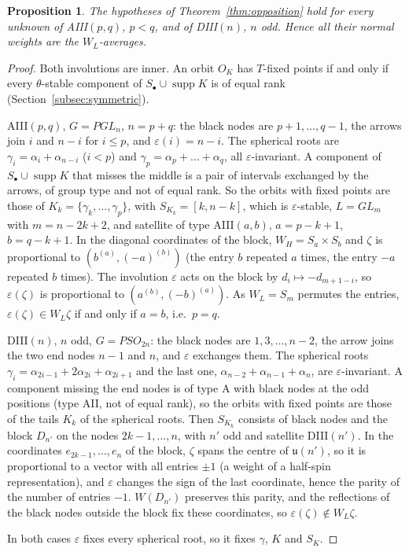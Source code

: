 \documentclass[11pt]{amsart}
\newtheorem{proposition}[theorem]{Proposition}
\theoremstyle{definition}
\theoremstyle{remark}
\DeclareMathOperator{\supp}{supp}
\begin{document}
\begin{proposition}\label{prop:oppositionAD}
The hypotheses of Theorem~\ref{thm:opposition} hold for every unknown of
AIII$(p,q)$, $p<q$, and of DIII$(n)$, $n$ odd. Hence all their normal weights
are the $W_L$-averages.
\end{proposition}
\begin{proof}
Both involutions are inner. An orbit $O_K$ has $T$-fixed points if and only
if every $\theta$-stable component of $S_\bullet\cup\supp K$ is of equal rank
(Section~\ref{subsec:symmetric}).

AIII$(p,q)$, $G=PGL_n$, $n=p+q$: the black nodes are $p+1,\dots,q-1$, the
arrows join $i$ and $n-i$ for $i\le p$, and $\varepsilon(i)=n-i$. The
spherical roots are $\gamma_i=\alpha_i+\alpha_{n-i}$ ($i<p$) and
$\gamma_p=\alpha_p+\dots+\alpha_q$, all $\varepsilon$-invariant. A component of
$S_\bullet\cup\supp K$ that misses the middle is a pair of intervals exchanged
by the arrows, of group type and not of equal rank. So the orbits with fixed
points are those of $K_k=\{\gamma_k,\dots,\gamma_p\}$, with
$S_{K_k}=[k,n-k]$, which is $\varepsilon$-stable, $L=GL_m$ with $m=n-2k+2$,
and satellite of type AIII$(a,b)$, $a=p-k+1$, $b=q-k+1$. In the diagonal
coordinates of the block, $W_H=S_a\times S_b$ and $\zeta$ is proportional to
$(b^{(a)},(-a)^{(b)})$ (the entry $b$ repeated $a$ times, the entry $-a$
repeated $b$ times). The involution $\varepsilon$ acts on the block by
$d_i\mapsto -d_{m+1-i}$, so $\varepsilon(\zeta)$ is proportional to
$(a^{(b)},(-b)^{(a)})$. As $W_L=S_m$ permutes the entries, $\varepsilon(\zeta)\in
W_L\zeta$ if and only if $a=b$, i.e.\ $p=q$.

DIII$(n)$, $n$ odd, $G=PSO_{2n}$: the black nodes are $1,3,\dots,n-2$, the arrow
joins the two end nodes $n-1$ and $n$, and $\varepsilon$ exchanges them. The
spherical roots $\gamma_i=\alpha_{2i-1}+2\alpha_{2i}+\alpha_{2i+1}$ and the last
one, $\alpha_{n-2}+\alpha_{n-1}+\alpha_n$, are $\varepsilon$-invariant. A
component missing the end nodes is of type A with black nodes at the odd
positions (type AII, not of equal rank), so the orbits with fixed points are
those of the tails $K_k$ of the spherical roots. Then $S_{K_k}$ consists of
black nodes and the block $D_{n'}$ on the nodes $2k-1,\dots,n$, with $n'$
odd and satellite DIII$(n')$. In the coordinates $e_{2k-1},\dots,e_n$ of the
block, $\zeta$ spans the centre of $\mathfrak u(n')$, so it is proportional to a
vector with all entries $\pm1$ (a weight of a half-spin representation), and
$\varepsilon$ changes the sign of the last coordinate, hence the parity of the
number of entries $-1$. $W(D_{n'})$ preserves this parity, and the
reflections of the black nodes outside the block fix these coordinates, so
$\varepsilon(\zeta)\notin W_L\zeta$.

In both cases $\varepsilon$ fixes every spherical root, so it fixes $\gamma$,
$K$ and $S_K$.
\end{proof}
\end{document}
